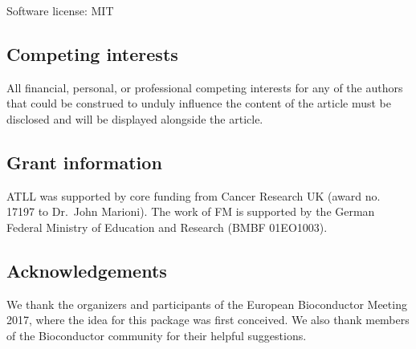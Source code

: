 \documentclass[10pt,a4paper,twocolumn]{article}
\begin{document}

Software license: MIT


\subsection*{Competing interests}
All financial, personal, or professional competing interests for any of the authors that
could be construed to unduly influence the content of the article must be disclosed and
will be displayed alongside the article.

\subsection*{Grant information}
ATLL was supported by core funding from Cancer Research UK (award no. 17197 to Dr.\ John Marioni).
The work of FM is supported by the German Federal Ministry of Education and Research (BMBF 01EO1003).

\subsection*{Acknowledgements}
We thank the organizers and participants of the European Bioconductor Meeting 2017, where the idea for this package was first conceived.
We also thank members of the Bioconductor community for their helpful suggestions.



{\small
}

\bigskip





\end{document}
